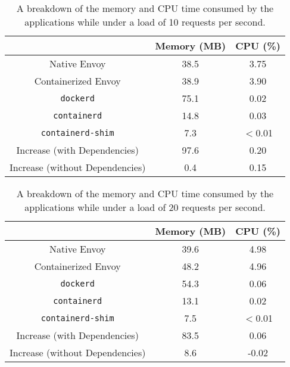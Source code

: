 \documentclass{article}
\begin{document}
\begin{table}[H]
\begin{tabular}{ |c|c|c| }
 \hline
   & Memory (MB) & CPU (\%) \\ 
 \hline
 Native Envoy & 38.5 & 3.75 \\
 \hline
 Containerized Envoy & 38.9 & 3.90 \\
 \hline
 \texttt{dockerd} & 75.1 & 0.02 \\
 \hline
 \texttt{containerd} & 14.8 & 0.03 \\
 \hline
 \texttt{containerd-shim} & 7.3 & $<$0.01 \\
 \hline\hline
 Increase (with Dependencies) & 97.6 & 0.20 \\
 \hline
 Increase (without Dependencies) & 0.4 & 0.15 \\
 \hline
\end{tabular}
\caption{A breakdown of the memory and CPU time consumed by the applications while under a load of 10 requests per second.}
\label{consumption-breakdown-under-load-10}
\end{table}

\begin{table}[H]
\begin{tabular}{ |c|c|c| }
 \hline
   & Memory (MB) & CPU (\%) \\ 
 \hline
 Native Envoy & 39.6 & 4.98 \\
 \hline
 Containerized Envoy & 48.2 & 4.96 \\
 \hline
 \texttt{dockerd} & 54.3 & 0.06 \\
 \hline
 \texttt{containerd} & 13.1 & 0.02 \\
 \hline
 \texttt{containerd-shim} & 7.5 & $<$0.01 \\
 \hline\hline
 Increase (with Dependencies) & 83.5 & 0.06 \\
 \hline
 Increase (without Dependencies) & 8.6 & -0.02 \\
 \hline
\end{tabular}
\caption{A breakdown of the memory and CPU time consumed by the applications while under a load of 20 requests per second.}
\label{consumption-breakdown-under-load-20}
\end{table}
\end{document}
